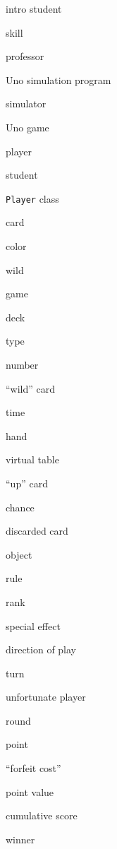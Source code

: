 \begin{samepage}
\begin{multicols}{3}
\small
\begin{compactitem}
\renewcommand\labelitemi{\raisebox{0.25ex}{\tiny$\bullet$}}
\item \textsf{intro student}
\item \textsf{skill}
\item \textsf{professor}
\item \textsf{Uno simulation program}
\item \textsf{simulator}
\item \textsf{Uno game}
\item \textsf{player}
\item \textsf{student}
\item \texttt{Player} \textsf{class}
\item \textsf{card}
\item \textsf{color}
\item \textsf{wild}
\columnbreak
\item \textsf{game}
\item \textsf{deck}
\item \textsf{type}
\item \textsf{number}
\item \textsf{``wild'' card}
\item \textsf{time}
\item \textsf{hand}
\item \textsf{virtual table}
\item \textsf{``up'' card}
\item \textsf{chance}
\item \textsf{discarded card}
\item \textsf{object}
\columnbreak
\item \textsf{rule}
\item \textsf{rank}
\item \textsf{special effect}
\item \textsf{direction of play}
\item \textsf{turn}
\item \textsf{unfortunate player}
\item \textsf{round}
\item \textsf{point}
\item \textsf{``forfeit cost''}
\item \textsf{point value}
\item \textsf{cumulative score}
\item \textsf{winner}
\end{compactitem}
\end{multicols}
\end{samepage}

